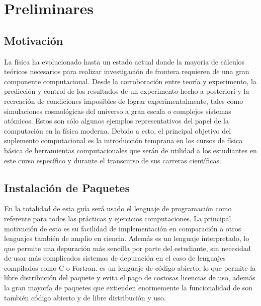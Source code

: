 \chapter{Preliminares}
\label{cha:prem}


\section{Motivación}
\label{sec:motiv}


La física ha evolucionado hasta un estado actual donde la mayoría de 
cálculos teóricos necesarios para realizar investigación de frontera 
requieren de una gran componente computacional. Desde la corroboración 
entre teoría y experimento, la predicción y control de los resultados de 
un experimento hecho a posteriori y la recreación de condiciones imposibles 
de lograr experimentalmente, tales como simulaciones cosmológicas del 
universo a gran escala o complejos sistemas atómicos. Estos son sólo 
algunos ejemplos representativos del papel de la computación en la física 
moderna. Debido a esto, el principal objetivo del suplemento computacional 
es la introducción temprana en los cursos de física básica de herramientas 
computacionales que serán de utilidad a los estudiantes en este curso 
específico y durante el transcurso de sus carreras científicas.






\section{Instalación de Paquetes}
\label{sec:instal}


En la totalidad de esta guía será usado el lenguaje de programación \python
como referente para todos las prácticas y ejercicios computaciones. La 
principal motivación de esto es su facilidad de implementación en 
comparación a otros lenguajes también de amplio en ciencia. Además es un 
lenguaje interpretado, lo que permite una depuración más sencilla por 
parte del estudiante, sin necesidad de usar más complicados sistemas de 
depuración en el caso de lenguajes compilados como C o Fortran. \python es 
un lenguaje de código abierto, lo que permite la libre distribución del 
paquete y evita el pago de costosas licencias de uso, además la gran 
mayoría de paquetes que extienden enormemente la funcionalidad de \python 
son también código abierto y de libre distribución y uso.

